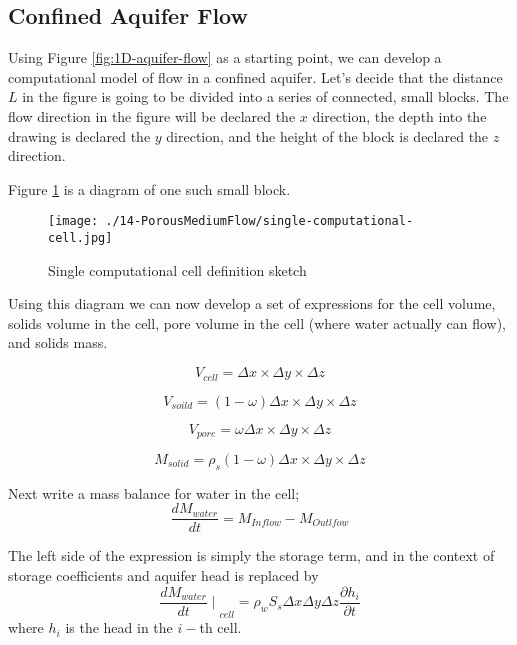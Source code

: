 \subsection{Confined Aquifer Flow}
Using Figure \ref{fig:1D-aquifer-flow} as a starting point, we can develop a computational model of flow in a confined aquifer.
Let's decide that the distance $L$ in the figure is going to be divided into a series of connected, small blocks.
The flow direction in the figure will be declared the $x$ direction, the depth into the drawing is declared the $y$ direction, and the height of the block is declared the $z$ direction.

Figure \ref{fig:single-computational-cell} is a diagram of one such small block.
\begin{figure}[h!] %
   \centering
   \texttt{[image: ./14-PorousMediumFlow/single-computational-cell.jpg]} 
   \caption{Single computational cell definition sketch}
   \label{fig:single-computational-cell}
\end{figure}

Using this diagram we can now develop a set of expressions for the cell volume, solids volume in the cell,  pore volume in the cell (where water actually can flow), and solids mass.

\begin{equation}
V_{cell} = \Delta x \times \Delta y \times \Delta z
\end{equation}

\begin{equation}
V_{soild} =(1-\omega) \Delta x \times \Delta y \times \Delta z
\end{equation}

\begin{equation}
V_{pore} = \omega \Delta x \times \Delta y \times \Delta z
\end{equation}

\begin{equation}
M_{solid} = \rho_{s} (1-\omega) \Delta x \times \Delta y \times \Delta z
\end{equation}

Next write a mass balance for water in the cell;
\begin{equation}
\frac{d M_{water}}{dt} = M_{Inflow} - M_{Outlfow}
\end{equation}

The left side of the expression is simply the storage term, and in the context of storage coefficients and aquifer head is replaced by
\begin{equation}
{\frac{d M_{water}}{dt}\mid}_{cell} =\rho_{w} S_{s} \Delta x \Delta y \Delta z \frac{\partial h_i}{\partial t}
\end{equation}
 where $h_i$ is the head in the $i-$th cell.  
 
